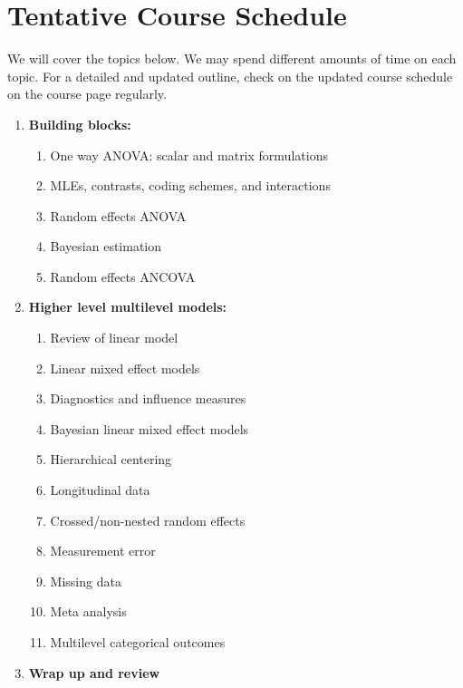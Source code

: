 \documentclass[11pt, a4paper]{article}
\begin{document}
\section{Tentative Course Schedule} 
We will cover the topics below. We may spend different amounts of time on each topic. For a detailed and updated outline, check on the updated course schedule on the course page regularly. 
\begin{enumerate}[label= {\color{darkblue}{\ArrowBoldRightStrobe}}]
	\item \textbf{Building blocks:}
	\begin{enumerate}[label= {\color{cyan}{\Rectangle}}]
		\item One way ANOVA: scalar and matrix formulations
		\item MLEs, contrasts, coding schemes, and interactions
		\item Random effects ANOVA
		\item Bayesian estimation
		\item Random effects ANCOVA
	\end{enumerate}

	\item \textbf{Higher level multilevel models: }
	\begin{enumerate}[label= {\color{cyan}{\Rectangle}}]
		\item Review of linear model
		\item Linear mixed effect models
		\item Diagnostics and influence measures
		\item Bayesian linear mixed effect models
		\item Hierarchical centering
		\item Longitudinal data
		\item Crossed/non-nested random effects
		\item Measurement error
		\item Missing data
		\item Meta analysis
		\item Multilevel categorical outcomes
	\end{enumerate}
	
	\item \textbf{Wrap up and review}
\end{enumerate}
\end{document}
